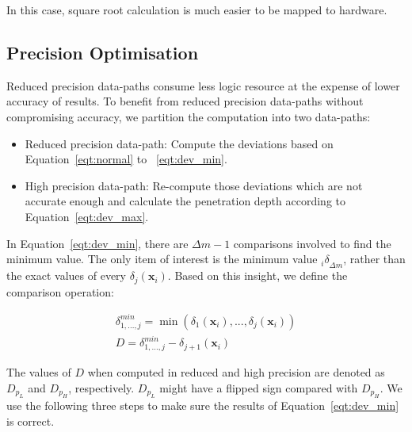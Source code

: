 In this case, square root calculation is much easier to be mapped to hardware.

\subsection{Precision Optimisation}
\label{sec:mixed_precision}
Reduced precision data-paths consume less logic resource at the expense of lower accuracy of results.
To benefit from reduced precision data-paths without compromising accuracy, we partition the computation into two data-paths:

\begin{itemize}
\item Reduced precision data-path: Compute the deviations based on Equation~\ref{eqt:normal} to ~\ref{eqt:dev_min}.
\item High precision data-path: Re-compute those deviations which are not accurate enough and calculate the penetration depth according to Equation~\ref{eqt:dev_max}.
\end{itemize}

In Equation~\ref{eqt:dev_min}, there are $\Delta m - 1$ comparisons involved to find the minimum value.
The only item of interest is the minimum value ${_i\delta}_{\Delta m}$, rather than the exact values of every $\delta_{j}(\boldsymbol{x}_i)$.
Based on this insight, we define the comparison operation:

\begin{equation}
\begin{aligned}
\delta^{min}_{1,...,j} = \min \left ( {\delta_{1}(\boldsymbol{x}_i),...,\delta_{j}(\boldsymbol{x}_i)} \right ) \\
D = \delta^{min}_{1,...,j} - \delta_{j+1}(\boldsymbol{x}_i)
\end{aligned}
\label{eqt:comparison}
\end{equation}

The values of $D$ when computed in reduced and high precision are denoted as $D_{p_L}$ and $D_{p_H}$, respectively.
$D_{p_L}$ might have a flipped sign compared with $D_{p_H}$.
We use the following three steps to make sure the results of Equation~\ref{eqt:dev_min} is correct.

